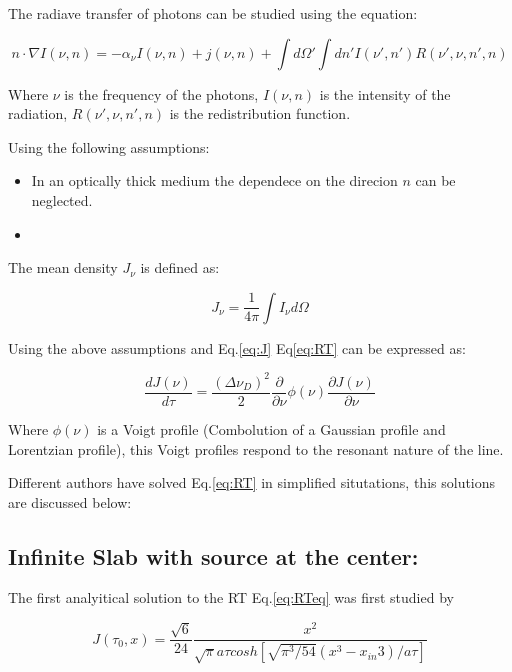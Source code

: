 The radiave transfer of \ly photons can be studied using the equation:
 
\begin{equation}\label{eq:RT}
n\cdot\nabla I(\nu, n)= - \alpha_{\nu} I(\nu, n) + j(\nu, n) + \int d\Omega' \int dn' I(\nu', n') R(\nu', \nu, n', n)
\end{equation}

Where $\nu$ is the frequency of the \ly photons, $I(\nu, n)$ is the intensity
of the radiation, $R(\nu', \nu, n', n)$ is the redistribution function.

Using the following assumptions:

\begin{itemize}
\item In an optically thick medium the dependece on the direcion {\bf{$n$}} can 
be neglected.

\item 
\end{itemize}

The mean density $J_{\nu}$ is defined as:

\begin{equation}\label{eq:J}
J_{\nu} = \dfrac{1}{4\pi}\int I_{\nu}d\Omega
\end{equation}

Using the above assumptions and Eq.\ref{eq:J} Eq\ref{eq:RT} can be expressed as: 

\begin{equation}\label{eq:RTeq}
\dfrac{dJ(\nu)}{d\tau} = \dfrac{(\Delta \nu_D)^2}{2}\dfrac{\partial}{\partial \nu}\phi(\nu)\dfrac{\partial J(\nu)}{\partial \nu}
\end{equation}

Where $\phi(\nu)$ is a Voigt profile (Combolution of a Gaussian profile  and Lorentzian profile), this Voigt profiles respond to the resonant nature of the line.

Different authors have solved Eq.\ref{eq:RT} in simplified situtations, 
this solutions are discussed below:

\subsection{Infinite Slab with \ly source at the center:}

The first analyitical solution to the RT Eq.\ref{eq:RTeq}
was first studied by \citep{Unno55, Osterbrock62, Adams72, Harrington73, Neufeld90}

\begin{equation}
J(\tau_0, x) = \dfrac{\sqrt{6}}{24}\dfrac{x^2}{\sqrt{\pi}a\tau cosh[\sqrt{\pi^3/54}(x^3-x_{in}3)/a\tau]}
\end{equation}

